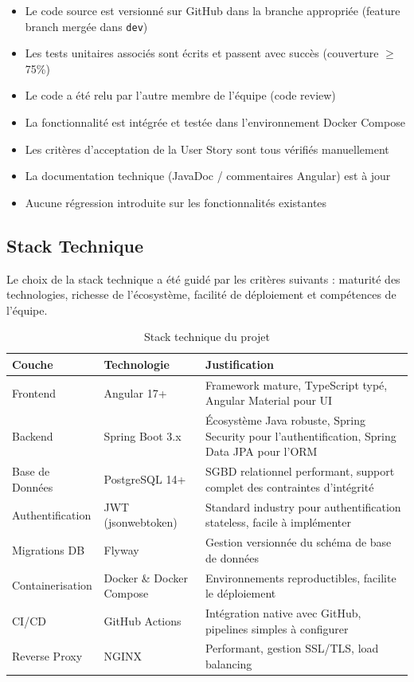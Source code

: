 \documentclass[12pt,a4paper]{report}
\begin{document}
\begin{itemize}[itemsep=0.4em]
    \item  Le code source est versionné sur GitHub dans la branche appropriée (feature branch mergée dans \texttt{dev})
    \item  Les tests unitaires associés sont écrits et passent avec succès (couverture $\geq$ 75\%)
    \item  Le code a été relu par l'autre membre de l'équipe (code review)
    \item  La fonctionnalité est intégrée et testée dans l'environnement Docker Compose
    \item  Les critères d'acceptation de la User Story sont tous vérifiés manuellement
    \item  La documentation technique (JavaDoc / commentaires Angular) est à jour
    \item  Aucune régression introduite sur les fonctionnalités existantes
\end{itemize}

\subsection{Stack Technique}

Le choix de la stack technique a été guidé par les critères suivants : maturité des technologies, richesse de l'écosystème, facilité de déploiement et compétences de l'équipe.

\begin{table}[H]
\centering
\caption{Stack technique du projet}
\begin{tabular}{|p{3cm}|p{4cm}|p{7cm}|}
\hline
\textbf{Couche} & \textbf{Technologie} & \textbf{Justification} \\
\hline
Frontend & Angular 17+ & Framework mature, TypeScript typé, Angular Material pour UI \\
\hline
Backend & Spring Boot 3.x & Écosystème Java robuste, Spring Security pour l'authentification, Spring Data JPA pour l'ORM \\
\hline
Base de Données & PostgreSQL 14+ & SGBD relationnel performant, support complet des contraintes d'intégrité \\
\hline
Authentification & JWT (jsonwebtoken) & Standard industry pour authentification stateless, facile à implémenter \\
\hline
Migrations DB & Flyway & Gestion versionnée du schéma de base de données \\
\hline
Containerisation & Docker \& Docker Compose & Environnements reproductibles, facilite le déploiement \\
\hline
CI/CD & GitHub Actions & Intégration native avec GitHub, pipelines simples à configurer \\
\hline
Reverse Proxy & NGINX & Performant, gestion SSL/TLS, load balancing \\
\hline
\end{tabular}
\end{table}
\end{document}
